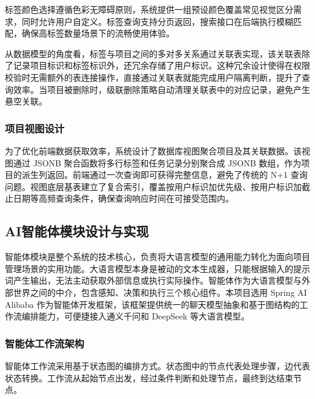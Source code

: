 \par 标签颜色选择遵循色彩无障碍原则，系统提供一组预设颜色覆盖常见视觉区分需求，同时允许用户自定义。标签查询支持分页返回，搜索接口在后端执行模糊匹配，确保高标签数量场景下的流畅使用体验。

\par 从数据模型的角度看，标签与项目之间的多对多关系通过关联表实现，该关联表除了记录项目标识和标签标识外，还冗余存储了用户标识。这种冗余设计使得在权限校验时无需额外的表连接操作，直接通过关联表就能完成用户隔离判断，提升了查询效率。当项目被删除时，级联删除策略自动清理关联表中的对应记录，避免产生悬空关联。

\subsubsection{项目视图设计}

\par 为了优化前端数据获取效率，系统设计了数据库视图聚合项目及其关联数据。该视图通过 JSONB 聚合函数将多行标签和任务记录分别聚合成 JSONB 数组，作为项目的派生列返回。前端通过一次查询即可获得完整信息，避免了传统的 N+1 查询问题。视图底层基表建立了复合索引，覆盖按用户标识加优先级、按用户标识加截止日期等高频查询条件，确保查询响应时间在可接受范围内。


\subsection{AI智能体模块设计与实现}
\par 智能体模块是整个系统的技术核心，负责将大语言模型的通用能力转化为面向项目管理场景的实用功能。大语言模型本身是被动的文本生成器，只能根据输入的提示词产生输出，无法主动获取外部信息或执行实际操作。智能体作为大语言模型与外部世界之间的中介，包含感知、决策和执行三个核心组件。本项目选用 Spring AI Alibaba 作为智能体开发框架，该框架提供统一的聊天模型抽象和基于图结构的工作流编排能力，可便捷接入通义千问和 DeepSeek 等大语言模型。

\subsubsection{智能体工作流架构}

\par 智能体工作流采用基于状态图的编排方式。状态图中的节点代表处理步骤，边代表状态转换。工作流从起始节点出发，经过条件判断和处理节点，最终到达结束节点。

